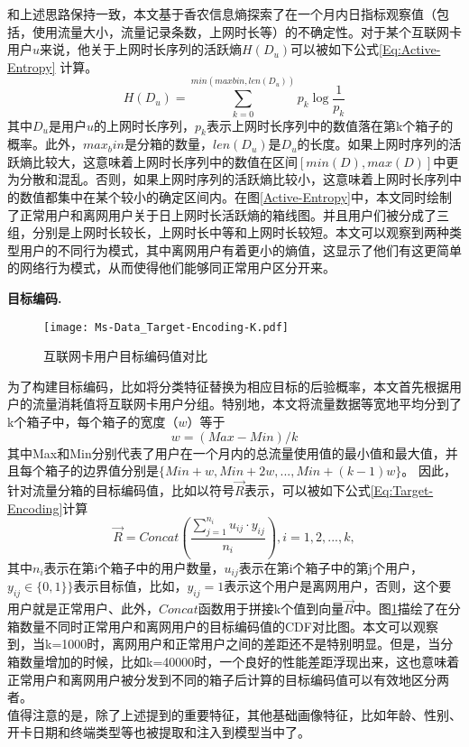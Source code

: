 和上述思路保持一致，本文基于香农信息熵探索了在一个月内日指标观察值（包括，使用流量大小，流量记录条数，上网时长等）的不确定性。对于某个互联网卡用户$u$来说，他关于上网时长序列的活跃熵$H(D_{u})$可以被如下公式\eqref{Eq:Active-Entropy} 计算。
\begin{equation}
	H(D_{u}) = \sum_{k=0}^{min(maxbin, len(D_{u}))} p_{k} \log \frac{1}{p_{k}}
	\label{Eq:Active-Entropy}
\end{equation}
其中$D_{u}$是用户$u$的上网时长序列，$p_{k}$表示上网时长序列中的数值落在第k个箱子的概率。此外，$max_bin$是分箱的数量，$len(D_{u})$是$D_{u}$的长度。如果上网时序列的活跃熵比较大，这意味着上网时长序列中的数值在区间$[min(D),max(D)]$中更为分散和混乱。否则，如果上网时序列的活跃熵比较小，这意味着上网时长序列中的数值都集中在某个较小的确定区间内。在图\ref{Active-Entropy}中，本文同时绘制了正常用户和离网用户关于日上网时长活跃熵的箱线图。并且用户们被分成了三组，分别是上网时长较长，上网时长中等和上网时长较短。本文可以观察到两种类型用户的不同行为模式，其中离网用户有着更小的熵值，这显示了他们有这更简单的网络行为模式，从而使得他们能够同正常用户区分开来。


\textbf{目标编码.}
\begin{figure}[hbt]
	\centering
	\texttt{[image: Ms-Data\_Target-Encoding-K.pdf]}
	\caption{互联网卡用户目标编码值对比}
	\label{Fig:Target-Encoding-K}
\end{figure}
为了构建目标编码，比如将分类特征替换为相应目标的后验概率，本文首先根据用户的流量消耗值将互联网卡用户分组。特别地，本文将流量数据等宽地平均分到了k个箱子中，每个箱子的宽度（$w$）等于
\begin{equation}
	w = (Max-Min)/k
	\label{Eq:bin-width}
\end{equation}
其中Max和Min分别代表了用户在一个月内的总流量使用值的最小值和最大值，并且每个箱子的边界值分别是$\{Min+w,Min+2w,...,Min+(k-1)w\}$。
因此，针对流量分箱的目标编码值，比如以符号$\vec{R}$表示，可以被如下公式\eqref{Eq:Target-Encoding}计算
\begin{equation}
	\vec{R} = Concat(\frac{\sum_{j=1}^{n_{i}}u_{ij} \cdot y_{ij}}{n_{i}}), i=1,2,...,k,
	\label{Eq:Target-Encoding}
\end{equation}
其中$n_{i}$表示在第i个箱子中的用户数量，$u_{ij}$表示在第i个箱子中的第j个用户，$y_{ij} \in \{0,1 \}\}$表示目标值，比如，$y_{ij}=1$表示这个用户是离网用户，否则，这个要用户就是正常用户、此外，$Concat$函数用于拼接k个值到向量$\vec{R}$中。图\ref{Fig:Target-Encoding-K}描绘了在分箱数量不同时正常用户和离网用户的目标编码值的CDF对比图。本文可以观察到，当k=1000时，离网用户和正常用户之间的差距还不是特别明显。但是，当分箱数量增加的时候，比如k=40000时，一个良好的性能差距浮现出来，这也意味着正常用户和离网用户被分发到不同的箱子后计算的目标编码值可以有效地区分两者。\\
值得注意的是，除了上述提到的重要特征，其他基础画像特征，比如年龄、性别、开卡日期和终端类型等也被提取和注入到模型当中了。


